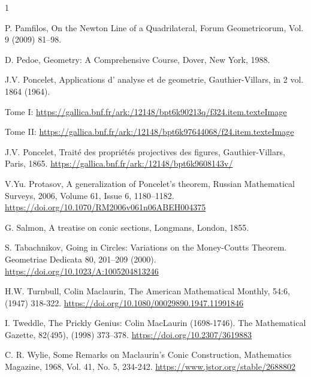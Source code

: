 \documentclass{birkjour}
\theoremstyle{definition}
\theoremstyle{remark}
\numberwithin{equation}{section}
\begin{document}
\begin{thebibliography}{1}
{ P. Pamfilos, On the Newton Line of a Quadrilateral, Forum Geometricorum, Vol. 9 (2009) 81–98.

 D. Pedoe, Geometry: A Comprehensive Course, Dover, New York, 1988.

 J.V. Poncelet, Applications d’ analyse et de geometrie, Gauthier-Villars, in 2 vol. 1864 (1964).

\noindent Tome I: \url{https://gallica.bnf.fr/ark:/12148/bpt6k90213q/f324.item.texteImage}

\noindent Tome II: \url{https://gallica.bnf.fr/ark:/12148/bpt6k97644068/f24.item.texteImage}

 J.V. Poncelet, Traité des propriétés projectives des figures,
Gauthier-Villars, Paris, 1865. \url{https://gallica.bnf.fr/ark:/12148/bpt6k9608143v/}

 V.Yu. Protasov, A generalization of Poncelet’s theorem,
Russian Mathematical Surveys, 2006, Volume 61, Issue 6,
1180–1182. \url{https://doi.org/10.1070/RM2006v061n06ABEH004375}
 
 G. Salmon, A treatise on conic sections, Longmans, London, 1855.

 S. Tabachnikov, Going in Circles: Variations on the Money-Coutts Theorem. Geometriae Dedicata 80, 201–209 (2000). \url{https://doi.org/10.1023/A:1005204813246}

 H.W. Turnbull, Colin Maclaurin, The American Mathematical Monthly, 54:6, (1947) 318-322. \url{https://doi.org/10.1080/00029890.1947.11991846}

 I. Tweddle, The Prickly Genius: Colin MacLaurin (1698-1746). The Mathematical Gazette, 82(495), (1998) 373–378. \url{https://doi.org/10.2307/3619883}

 C. R. Wylie, Some Remarks on Maclaurin's Conic Construction, Mathematics Magazine, 1968, Vol. 41, No. 5, 234-242. \url{https://www.jstor.org/stable/2688802}}

\end{thebibliography}

\end{document}
